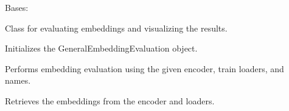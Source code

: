 \documentclass[letterpaper,10pt,english]{sphinxhowto}
\begin{document}
\begin{fulllineitems}
\label{\detokenize{top:top.GeneralEmbeddingEvaluation}}
\pysigstartsignatures
{}
\pysigstopsignatures
\sphinxAtStartPar
Bases: 

\sphinxAtStartPar
Class for evaluating embeddings and visualizing the results.

\begin{fulllineitems}
\label{\detokenize{top:top.GeneralEmbeddingEvaluation.__init__}}
\pysigstartsignatures
{}
\pysigstopsignatures
\sphinxAtStartPar
Initializes the GeneralEmbeddingEvaluation object.

\end{fulllineitems}


\begin{fulllineitems}
\label{\detokenize{top:top.GeneralEmbeddingEvaluation.embedding_evaluation}}
\pysigstartsignatures
{}
\pysigstopsignatures
\sphinxAtStartPar
Performs embedding evaluation using the given encoder, train loaders, and names.

\end{fulllineitems}


\begin{fulllineitems}
\label{\detokenize{top:top.GeneralEmbeddingEvaluation.get_embeddings}}
\pysigstartsignatures
{}
\pysigstopsignatures
\sphinxAtStartPar
Retrieves the embeddings from the encoder and loaders.


\end{fulllineitems}
\end{fulllineitems}
\end{document}
